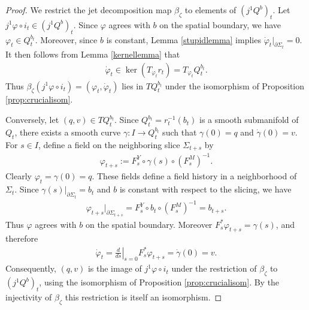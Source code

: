 \documentclass[10pt,a4paper]{amsart}
\begin{document}
\begin{proof}
We restrict the jet decomposition map $\beta_\zeta$ to elements of
$(j^1Q^b)_t$. Let $j^1\varphi\circ i_t\in(j^1Q^b)_t$. Since
$\varphi$ agrees with $b$ on the spatial boundary, we have $\varphi_t\in Q_t^{b_t}$.
Moreover, since $b$ is constant, Lemma \ref{stupidlemma} implies $\dot{\varphi}_t|_{\partial\Sigma_t}=0$. It then follows from Lemma \ref{kernellemma} that
\begin{align*}
    \dot{\varphi}_t
    \in
    \ker(T_{\varphi_t}r_t)
    =
    T_{\varphi_t}Q_t^{b_t}.
\end{align*}
Thus $\beta_\zeta(j^1\varphi\circ i_t)
    =(\varphi_t,\dot{\varphi}_t)$ lies in $TQ_t^{b_t}$ under the isomorphism of Proposition \ref{prop:crucialisom}.

Conversely, let $(q,v)\in TQ_t^{b_t}$. Since $Q_t^{b_t}=r_t^{-1}(b_t)$ is a
smooth submanifold of $Q_t$, there exists a smooth curve $\gamma:I\longrightarrow Q_t^{b_t}$ such that $\gamma(0)=q$ and $\dot{\gamma}(0)=v$. For $s\in I$, define a field on the
neighboring slice $\Sigma_{t+s}$ by
\begin{align*}
    \varphi_{t+s}
    :=
    F_s^Y\circ\gamma(s)\circ(F_s^M)^{-1}.
\end{align*}
Clearly $\varphi_t=\gamma(0)=q$. These fields define a field history in a neighborhood of
$\Sigma_t$. Since $\gamma(s)|_{\partial\Sigma_t}=b_t$ and $b$ is
constant with respect to the slicing, we have
\begin{align*}
    \varphi_{t+s}|_{\partial\Sigma_{t+s}}
    =
    F_s^Y\circ b_t\circ(F_s^M)^{-1}
    =
    b_{t+s}.
\end{align*}
Thus $\varphi$ agrees with $b$ on the spatial boundary. Moreover $F_s^*\varphi_{t+s}=\gamma(s)$,
and therefore
\begin{align*}
    \dot{\varphi}_t
    =
    \left.\frac{d}{ds}\right|_{s=0}
    F_s^*\varphi_{t+s}
    =
    \dot{\gamma}(0)
    =
    v.
\end{align*}
Consequently, $(q,v)$ is the image of $j^1\varphi\circ i_t$ under the restriction of
$\beta_\zeta$ to $(j^1Q^b)_t$, using the isomorphism of Proposition
\ref{prop:crucialisom}. By the injectivity of $\beta_\zeta$ this restriction is itself an isomorphism.
\end{proof}
\end{document}
